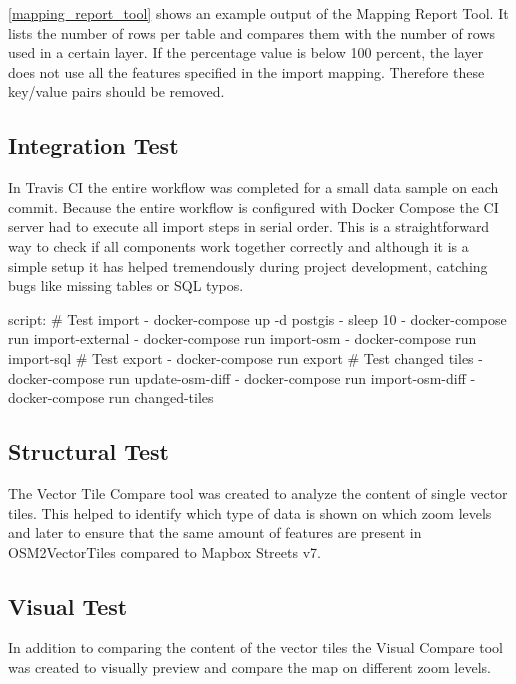 \autoref{mapping_report_tool} shows an example output of the Mapping Report Tool. It lists the number of rows per table and compares them with the number of rows used in a certain layer. If the percentage value is below 100 percent, the layer does not use all the features specified in the import mapping. Therefore these \osm{} key/value pairs should be removed.

\subsection{Integration Test}

In Travis CI\cite{pm_5_travis-ci.org_2015} the entire workflow was completed for a small data sample on each commit.
Because the entire workflow is configured with Docker Compose \cite{pm_6_docs.docker.com_2015} the CI server had to execute all import steps in serial order. This is a straightforward way to check if all components work together correctly
and although it is a simple setup it has helped tremendously during project development, catching bugs
like missing tables or SQL typos.

\begin{yamlcode}
script:
  # Test import
  - docker-compose up -d postgis
  - sleep 10
  - docker-compose run import-external
  - docker-compose run import-osm
  - docker-compose run import-sql
  # Test export
  - docker-compose run export
  # Test changed tiles
  - docker-compose run update-osm-diff
  - docker-compose run import-osm-diff
  - docker-compose run changed-tiles
\end{yamlcode}

\subsection{Structural Test}

The Vector Tile Compare tool was created to analyze the content of single vector tiles. This helped to identify which type of data is shown on which zoom levels and later to ensure that the same amount of features are present in OSM2VectorTiles compared to Mapbox Streets v7.

\subsection{Visual Test}

In addition to comparing the content of the vector tiles the Visual Compare tool was created to visually preview and compare the map on different zoom levels. 

